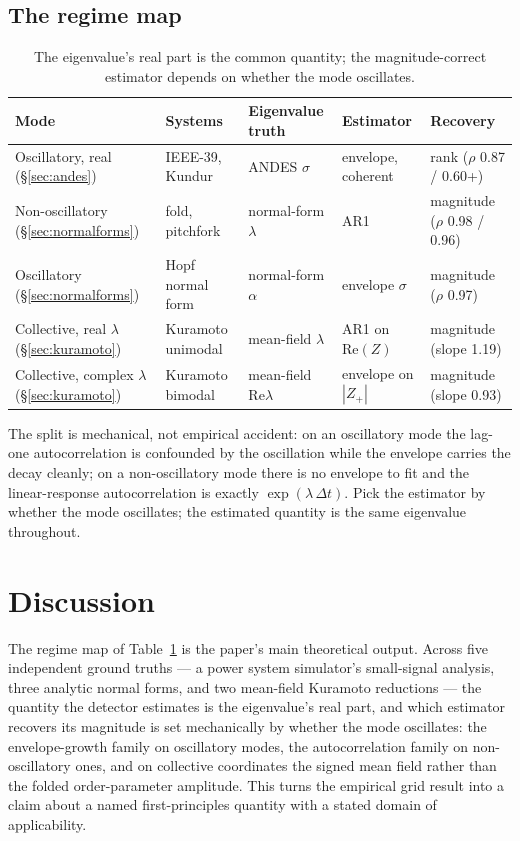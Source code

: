 \documentclass[journal]{IEEEtran}
\begin{document}
\subsection{The regime map}\label{sec:regimemap}

\begin{table}[t]
\centering
\scriptsize
\setlength{\tabcolsep}{3pt}
\begin{tabular}{lllll}
\toprule
Mode & Systems & Eigenvalue truth & Estimator & Recovery \\
\midrule
Oscillatory, real (\S\ref{sec:andes}) & IEEE-39, Kundur & ANDES $\sigma$ & envelope, coherent & rank ($\rho$ 0.87 / 0.60+) \\
Non-oscillatory (\S\ref{sec:normalforms}) & fold, pitchfork & normal-form $\lambda$ & AR1 & magnitude ($\rho$ 0.98 / 0.96) \\
Oscillatory (\S\ref{sec:normalforms}) & Hopf normal form & normal-form $\alpha$ & envelope $\sigma$ & magnitude ($\rho$ 0.97) \\
Collective, real $\lambda$ (\S\ref{sec:kuramoto}) & Kuramoto unimodal & mean-field $\lambda$ & AR1 on $\mathrm{Re}(Z)$ & magnitude (slope 1.19) \\
Collective, complex $\lambda$ (\S\ref{sec:kuramoto}) & Kuramoto bimodal & mean-field $\mathrm{Re}\lambda$ & envelope on $|Z_+|$ & magnitude (slope 0.93) \\
\bottomrule
\end{tabular}
\caption{The eigenvalue's real part is the common quantity; the
magnitude-correct estimator depends on whether the mode oscillates.}
\label{tab:regimemap}
\end{table}

The split is mechanical, not empirical accident: on an oscillatory mode
the lag-one autocorrelation is confounded by the oscillation while the
envelope carries the decay cleanly; on a non-oscillatory mode there is
no envelope to fit and the linear-response autocorrelation is exactly
$\exp(\lambda\,\Delta t)$. Pick the estimator by whether the mode
oscillates; the estimated quantity is the same eigenvalue throughout.

\section{Discussion}\label{sec:discussion}

The regime map of Table~\ref{tab:regimemap} is the paper's main
theoretical output. Across five independent ground truths --- a power
system simulator's small-signal analysis, three analytic normal forms,
and two mean-field Kuramoto reductions --- the quantity the detector
estimates is the eigenvalue's real part, and which estimator recovers
its magnitude is set mechanically by whether the mode oscillates: the
envelope-growth family on oscillatory modes, the autocorrelation family
on non-oscillatory ones, and on collective coordinates the signed mean
field rather than the folded order-parameter amplitude. This turns the
empirical grid result into a claim about a named first-principles
quantity with a stated domain of applicability.
\end{document}
